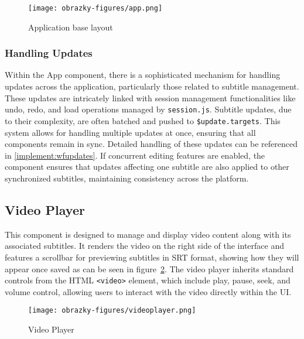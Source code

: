 \begin{figure}[ht]
\centering
\texttt{[image: obrazky-figures/app.png]}
\caption{Application base layout}
\label{fig:implement:app}
\end{figure}

\subsubsection{Handling Updates}

Within the App component, there is a sophisticated mechanism for handling updates across the application, particularly those related to subtitle management. These updates are intricately linked with session management functionalities like undo, redo, and load operations managed by \texttt{session.js}. Subtitle updates, due to their complexity, are often batched and pushed to \texttt{\$update.targets}. This system allows for handling multiple updates at once, ensuring that all components remain in sync. Detailed handling of these updates can be referenced in \ref{implement:wfupdates}. If concurrent editing features are enabled, the component ensures that updates affecting one subtitle are also applied to other synchronized subtitles, maintaining consistency across the platform.

\subsection{Video Player}

This component is designed to manage and display video content along with its associated subtitles. It renders the video on the right side of the interface and features a scrollbar for previewing subtitles in SRT format, showing how they will appear once saved as can be seen in figure~\ref{fig:implementation:videoplayer}. The video player inherits standard controls from the HTML \texttt{<video>} element, which include play, pause, seek, and volume control, allowing users to interact with the video directly within the UI.

\begin{figure}[ht]
    \centering
    \texttt{[image: obrazky-figures/videoplayer.png]}
    \caption{Video Player}
    \label{fig:implementation:videoplayer}
\end{figure}

